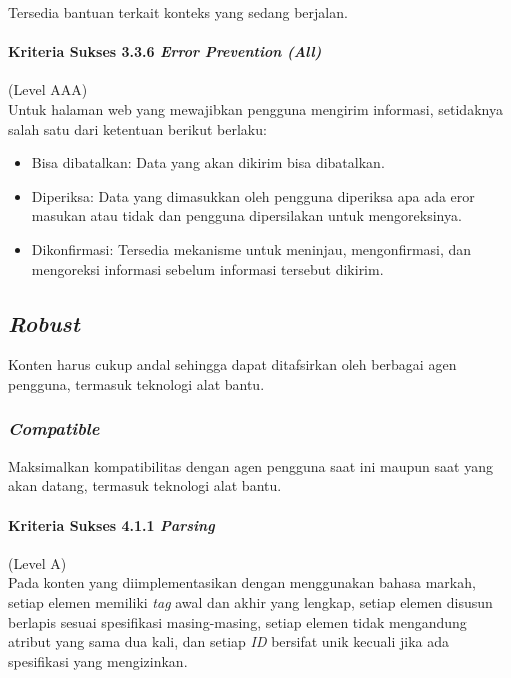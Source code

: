 Tersedia bantuan terkait konteks yang sedang berjalan.

\paragraph{Kriteria Sukses 3.3.6 \textit{Error Prevention (All)}}
\label{sec:kriteria_sukses_3.3.6}
(Level AAA)\\

Untuk halaman web yang mewajibkan pengguna mengirim informasi, setidaknya salah satu dari ketentuan berikut berlaku:
\begin{itemize}
	\item Bisa dibatalkan: Data yang akan dikirim bisa dibatalkan.
	\item Diperiksa: Data yang dimasukkan oleh pengguna diperiksa apa ada eror masukan atau tidak dan pengguna dipersilakan untuk mengoreksinya.
	\item Dikonfirmasi: Tersedia mekanisme untuk meninjau, mengonfirmasi, dan mengoreksi informasi sebelum informasi tersebut dikirim.
\end{itemize}


\subsection{\textit{Robust}}
\label{sec:robust}
Konten harus cukup andal sehingga dapat ditafsirkan oleh berbagai agen pengguna, termasuk teknologi alat bantu.

\subsubsection{\textit{Compatible}}
\label{sec:compatible}
Maksimalkan kompatibilitas dengan agen pengguna saat ini maupun saat yang akan datang, termasuk teknologi alat bantu.

\paragraph{Kriteria Sukses 4.1.1 \textit{Parsing}}
\label{sec:kriteria_sukses_4.1.1}
(Level A)\\

Pada konten yang diimplementasikan dengan menggunakan bahasa markah, setiap elemen memiliki \textit{tag} awal dan akhir yang lengkap, setiap elemen disusun berlapis sesuai spesifikasi masing-masing, setiap elemen tidak mengandung atribut yang sama dua kali, dan setiap \textit{ID} bersifat unik kecuali jika ada spesifikasi yang mengizinkan.

